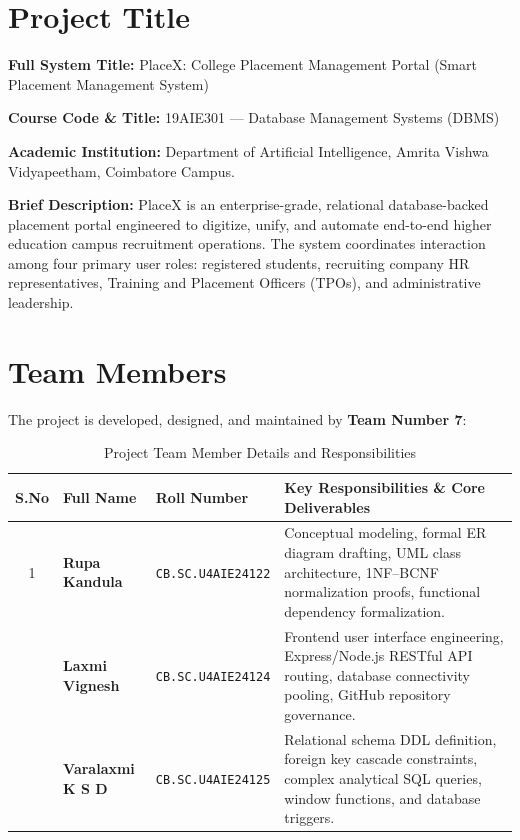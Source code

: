 \documentclass[11pt,a4paper]{article}
\begin{document}
\newpage
\tableofcontents
\newpage

\section{Project Title}
\label{sec:project_title}

\textbf{Full System Title:} PlaceX: College Placement Management Portal (Smart Placement Management System)

\textbf{Course Code \& Title:} 19AIE301 --- Database Management Systems (DBMS)

\textbf{Academic Institution:} Department of Artificial Intelligence, Amrita Vishwa Vidyapeetham, Coimbatore Campus.

\textbf{Brief Description:} PlaceX is an enterprise-grade, relational database-backed placement portal engineered to digitize, unify, and automate end-to-end higher education campus recruitment operations. The system coordinates interaction among four primary user roles: registered students, recruiting company HR representatives, Training and Placement Officers (TPOs), and administrative leadership.

\section{Team Members}
\label{sec:team_members}

The project is developed, designed, and maintained by \textbf{Team Number 7}:

\begin{table}[H]
    \centering
    \caption{Project Team Member Details and Responsibilities}
    \label{tab:team_members}
    \begin{tabularx}{\textwidth}{c l l X}
        \toprule
        \textbf{S.No} & \textbf{Full Name} & \textbf{Roll Number} & \textbf{Key Responsibilities \& Core Deliverables} \\
        \midrule
        1 & \textbf{Rupa Kandula} & \texttt{CB.SC.U4AIE24122} & Conceptual modeling, formal ER diagram drafting, UML class architecture, 1NF--BCNF normalization proofs, functional dependency formalization. \\
        \addlinespace
        2 & \textbf{Laxmi Vignesh} & \texttt{CB.SC.U4AIE24124} & Frontend user interface engineering, Express/Node.js RESTful API routing, database connectivity pooling, GitHub repository governance. \\
        \addlinespace
        3 & \textbf{Varalaxmi K S D} & \texttt{CB.SC.U4AIE24125} & Relational schema DDL definition, foreign key cascade constraints, complex analytical SQL queries, window functions, and database triggers. \\
        \bottomrule
    \end{tabularx}
\end{table}
\end{document}
